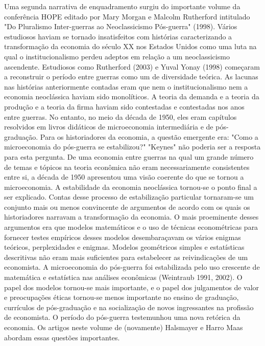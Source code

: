 \documentclass[a4paper,12pt]{article}[abntex2]
\begin{document}
Uma segunda narrativa de enquadramento surgiu do importante volume da conferência HOPE editado por Mary Morgan e Malcolm Rutherford intitulado "Do Pluralismo Inter-guerras ao Neoclassicismo Pós-guerra" (1998). Vários estudiosos haviam se tornado insatisfeitos com histórias caracterizando a transformação da economia do século XX nos Estados Unidos como uma luta na qual o institucionalismo perdeu adeptos em relação a um neoclassicismo ascendente. Estudiosos como Rutherford (2003) e Yuval Yonay (1998) começaram a reconstruir o período entre guerras como um de diversidade teórica. As lacunas nas histórias anteriormente contadas eram que nem o institucionalismo nem a economia neoclássica haviam sido monolíticos. A teoria da demanda e a teoria da produção e a teoria da firma haviam sido contestadas e contestadas nos anos entre guerras. No entanto, no meio da década de 1950, eles eram capítulos resolvidos em livros didáticos de microeconomia intermediária e de pós-graduação. Para os historiadores da economia, a questão emergente era: "Como a microeconomia do pós-guerra se estabilizou?" "Keynes" não poderia ser a resposta para esta pergunta. De uma economia entre guerras na qual um grande número de temas e tópicos na teoria econômica não eram necessariamente consistentes entre si, a década de 1950 apresentou uma visão coerente do que se tornou a microeconomia. A estabilidade da economia neoclássica tornou-se o ponto final a ser explicado. Contas desse processo de estabilização particular tornaram-se um conjunto mais ou menos convincente de argumentos de acordo com os quais os historiadores narravam a transformação da economia. O mais proeminente desses argumentos era que modelos matemáticos e o uso de técnicas econométricas para fornecer testes empíricos desses modelos desembaraçavam os vários enigmas teóricos, perplexidades e enigmas. Modelos geométricos simples e estatísticas descritivas não eram mais suficientes para estabelecer as reivindicações de um economista. A microeconomia do pós-guerra foi estabilizada pelo uso crescente de matemática e estatística nas análises econômicas (Weintraub 1991, 2002). O papel dos modelos tornou-se mais importante, e o papel dos julgamentos de valor e preocupações éticas tornou-se menos importante no ensino de graduação, currículos de pós-graduação e na socialização de novos ingressantes na profissão de economista. O período do pós-guerra testemunhou uma nova retórica da economia. Os artigos neste volume de (novamente) Halsmayer e Harro Maas abordam essas questões importantes.
\end{document}
